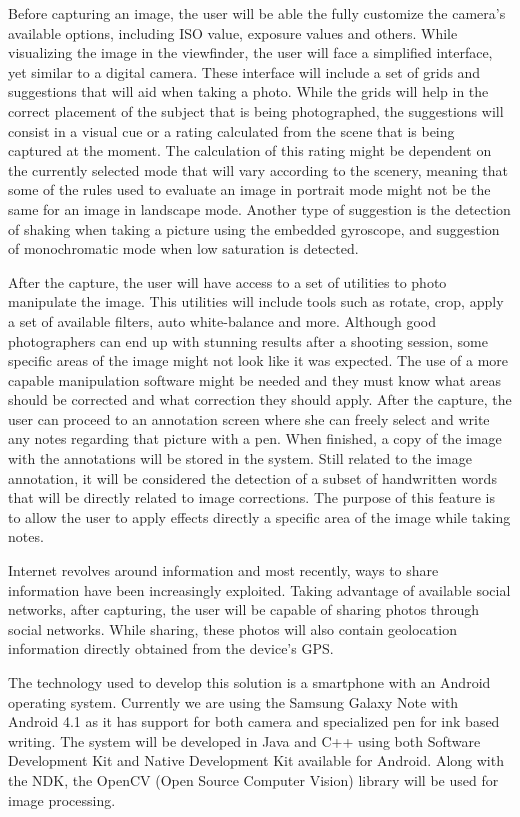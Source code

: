 Before capturing an image, the user will be able the fully customize the camera's available options, including ISO value, exposure values and others. While visualizing the image in the viewfinder, the user will face a simplified interface, yet similar to a digital camera. 
These interface will include a set of grids and suggestions that will aid when taking a photo. While the grids will help in the correct placement of the subject that is being photographed, the suggestions will consist in a visual cue or a rating calculated from the scene that is being captured at the moment. 
The calculation of this rating might be dependent on the currently selected mode that will vary according to the scenery, meaning that some of the rules used to evaluate an image in portrait mode might not be the same for an image in landscape mode. Another type of suggestion is the detection of shaking when taking a picture using the embedded gyroscope, and suggestion of monochromatic mode when low saturation is detected.

After the capture, the user will have access to a set of utilities to photo manipulate the image. This utilities will include tools such as rotate, crop, apply a set of available filters, auto white-balance and  more.
Although good photographers can end up with stunning results after a shooting session, some specific areas of the image might not look like it was expected. The use of a more capable manipulation software might be needed and they must know what areas should be corrected and what correction they should apply. After the capture, the user can proceed to an annotation screen where she can freely select and write any notes regarding that picture with a pen. When finished, a copy of the image with the annotations will be stored in the system. Still related to the image annotation, it will be considered the detection of a subset of handwritten words that will be directly related to image corrections. The purpose of this feature is to allow the user to apply effects directly a specific area of the image while taking notes.

Internet revolves around information and most recently, ways to share information have been increasingly exploited. Taking advantage of available social networks, after capturing, the user will be capable of sharing photos through social networks. While sharing, these photos will also contain geolocation information directly obtained from the device's GPS.

The technology used to develop this solution is a smartphone with an Android operating system. Currently we are using the Samsung Galaxy Note with Android 4.1 as it has support for both camera and specialized pen for ink based writing. The system will be developed in Java and C++ using both Software Development Kit \cite{SDK} and Native Development Kit \cite{NDK} available for Android.  Along with the NDK, the OpenCV (Open Source Computer Vision) \cite{OCV} library will be used for image processing.

